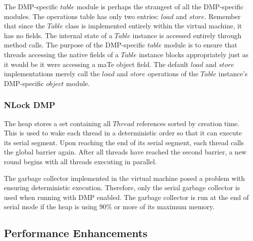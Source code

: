 The DMP-specific $table$ module is perhaps the strangest of all the
DMP-specific modules.  The operations table has only two entries:
$load$ and $store$.  Remember that since the $Table$ class is
implemented entirely within the virtual machine, it has no fields.
The internal state of a $Table$ instance is accessed entirely through
method calls.  The purpose of the DMP-specific $table$ module is to
ensure that threads accessing the native fields of a $Table$ instance
blocks appropriately just as it would be it were accessing a maTe
object field.  The default $load$ and $store$ implementations merely
call the $load$ and $store$ operations of the $Table$ instance's
DMP-specific $object$ module.

\subsubsection{NLock DMP}

The heap stores a set containing all $Thread$ references sorted by
creation time.  This is used to wake each thread in a deterministic
order so that it can execute its serial segment.  Upon reaching the
end of its serial segment, each thread calls the global barrier again.
After all threads have reached the second barrier, a new round begins
with all threads executing in parallel.

The garbage collector implemented in the virtual machine posed a
problem with ensuring deterministic execution.  Therefore, only the
serial garbage collector is used when running with DMP enabled.  The
garbage collector is run at the end of serial mode if the heap is
using $90\%$ or more of its maximum memory.

\subsection{Performance Enhancements}

%
% 
% 

